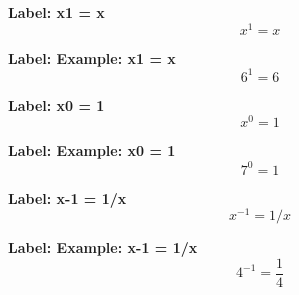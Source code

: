 \textbf{Label: x1 = x}
\[x^{1} = x\]

\textbf{Label: Example: x1 = x}
\[6^{1}=6\]

\textbf{Label: x0 = 1}
\[x^{0} = 1\]

\textbf{Label: Example: x0 = 1}
\[7^{0}=1\]

\textbf{Label: x-1 = 1/x}
\[x^{-1} = 1/x\]

\textbf{Label: Example: x-1 = 1/x}
\[4^{-1}=\frac{1}{4}\]

